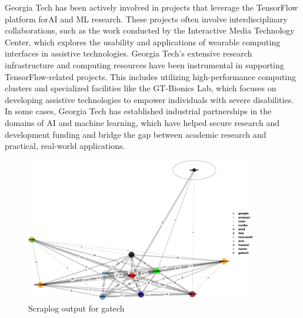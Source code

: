 \documentclass[CHICAGO,Times1COL]{WileyNJDv5} %
\begin{document}
Georgia Tech has been actively involved in projects that leverage the TensorFlow platform for\ac{AI} and \ac{ML}  research. These projects often involve interdisciplinary collaborations, such as the work conducted by the Interactive Media Technology Center, which explores the usability and applications of wearable computing interfaces in assistive technologies. Georgia Tech's extensive research infrastructure and computing resources have been instrumental in supporting TensorFlow-related projects. This includes utilizing high-performance computing clusters and specialized facilities like the GT-Bionics Lab, which focuses on developing assistive technologies to empower individuals with severe disabilities. In some cases, Georgia Tech has established industrial partnerships in the domains of AI and machine learning, which have helped secure research and development funding and bridge the gap between academic research and practical, real-world applications.








\begin{figure}[h]
\centering
\includegraphics[keepaspectratio=true,width=0.9\textwidth]{./Figures/noo/gatech_cropped.pdf}
\caption{Scraplog output for gatech}
\label{figgatech}
\end{figure}
\end{document}
